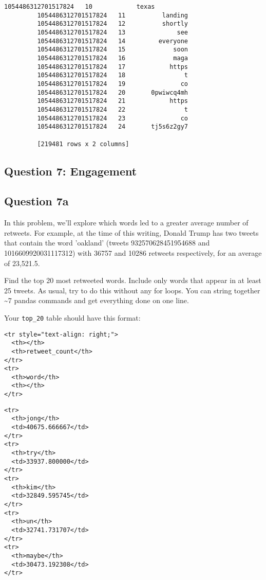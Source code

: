 \documentclass[11pt]{article}
\begin{document}
\begin{Verbatim}[commandchars=\\\{\}]
         1054486312701517824   10            texas
         1054486312701517824   11          landing
         1054486312701517824   12          shortly
         1054486312701517824   13              see
         1054486312701517824   14         everyone
         1054486312701517824   15             soon
         1054486312701517824   16             maga
         1054486312701517824   17            https
         1054486312701517824   18                t
         1054486312701517824   19               co
         1054486312701517824   20       0pwiwcq4mh
         1054486312701517824   21            https
         1054486312701517824   22                t
         1054486312701517824   23               co
         1054486312701517824   24       tj5s6z2gy7
         
         [219481 rows x 2 columns]
\end{Verbatim}
            
    \subsection{Question 7: Engagement}\label{question-7-engagement}

\subsection{Question 7a}\label{question-7a}

In this problem, we'll explore which words led to a greater average
number of retweets. For example, at the time of this writing, Donald
Trump has two tweets that contain the word 'oakland' (tweets
932570628451954688 and 1016609920031117312) with 36757 and 10286
retweets respectively, for an average of 23,521.5.

Find the top 20 most retweeted words. Include only words that appear in
at least 25 tweets. As usual, try to do this without any for loops. You
can string together \textasciitilde{}7 pandas commands and get
everything done on one line.

Your \texttt{top\_20} table should have this format:

\begin{verbatim}
<tr style="text-align: right;">
  <th></th>
  <th>retweet_count</th>
</tr>
<tr>
  <th>word</th>
  <th></th>
</tr>
\end{verbatim}

\begin{verbatim}
<tr>
  <th>jong</th>
  <td>40675.666667</td>
</tr>
<tr>
  <th>try</th>
  <td>33937.800000</td>
</tr>
<tr>
  <th>kim</th>
  <td>32849.595745</td>
</tr>
<tr>
  <th>un</th>
  <td>32741.731707</td>
</tr>
<tr>
  <th>maybe</th>
  <td>30473.192308</td>
</tr>
\end{verbatim}
\end{document}
